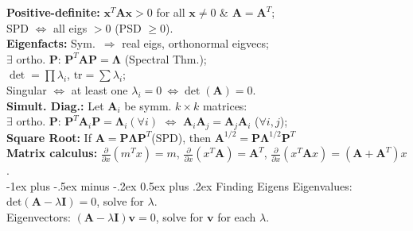 \documentclass[10pt,landscape]{article}
\makeatletter
\renewcommand{\subsection}{\@startsection{subsection}{2}{0mm}%
                                {-1ex plus -.5ex minus -.2ex}%
                                {0.5ex plus .2ex}%
                                {\normalfont\small\bfseries}}
\makeatother
\begin{document}
\begin{multicols}{3}
\smallskip
\textbf{Positive-definite:} $\mathbf{x}^T \mathbf{A} \mathbf{x} > 0$ for all $\mathbf{x}\neq 0$ \& $\mathbf{A} = \mathbf{A}^T$;\\
\hspace*{1em} SPD $\Leftrightarrow$ all eigs $>0$ (PSD $\ge0$).\\
\smallskip
\textbf{Eigenfacts:} Sym.\ $\Rightarrow$ real eigs, orthonormal eigvecs; \\
\hspace*{1em} $\exists$ ortho. $\mathbf{P}$: $\mathbf{P}^T \mathbf{A} \mathbf{P} = \mathbf{\Lambda}$ (Spectral Thm.);\\
\hspace*{1em} $\det = \prod \lambda_i$, $\mathrm{tr} = \sum\lambda_i$;\\
\hspace*{1em} Singular $\Leftrightarrow$ at least one $\lambda_i = 0 \ \Leftrightarrow \det(\mathbf{A}) = 0$.\\
\smallskip
\textbf{Simult. Diag.:} Let $\mathbf{A}_i$ be symm. $k \times k$ matrices:\\
\hspace*{1em} $\exists$ ortho. $\mathbf{P}$: $\mathbf{P}^T \mathbf{A}_i \mathbf{P} = \mathbf{\Lambda}_i (\forall i)$ $\Leftrightarrow$ $\mathbf{A}_i \mathbf{A}_j=\mathbf{A}_j\mathbf{A}_i$ ($\forall i,j$);\\
\smallskip
\textbf{Square Root:} If $\mathbf A= \mathbf P\boldsymbol\Lambda\mathbf P^T$(SPD), then $\mathbf A^{1/2}= \mathbf P\boldsymbol\Lambda^{1/2}\mathbf P^T$\\
\smallskip
\textbf{Matrix calculus:} $\frac{\partial}{\partial x}(m^T x) = m$, 
$\frac{\partial}{\partial x}(x^T \mathbf{A}) = \mathbf{A}^T$, 
$\frac{\partial}{\partial x}(x^T \mathbf{A} x) = (\mathbf{A}+\mathbf{A}^T)x$.\\
\medskip
\subsection{Finding Eigens}
Eigenvalues: $\mathrm{det}(\mathbf A-\lambda\mathbf I) = 0$, solve for $\lambda$.\\
Eigenvectors: $(\mathbf A-\lambda\mathbf I)\mathbf v=0$, solve for $ \mathbf v$ for each $\lambda$.\\
\medskip

\end{multicols}
\end{document}
